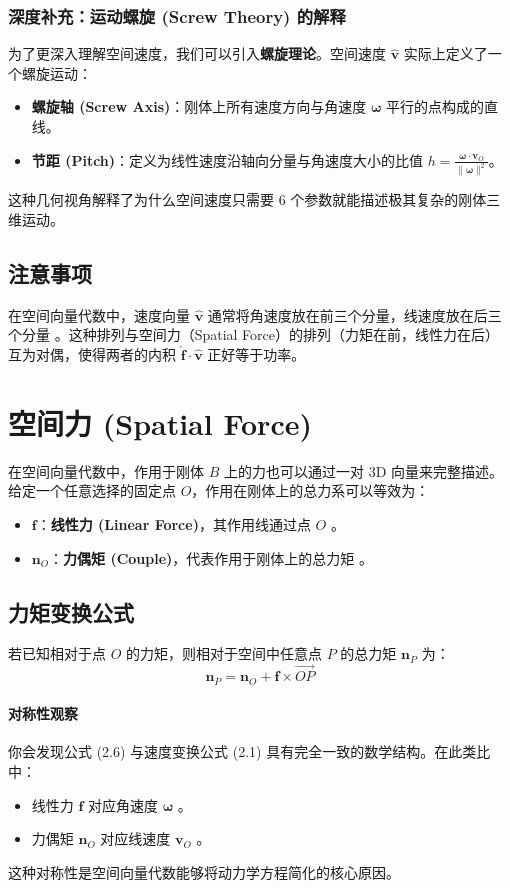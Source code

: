 \subsubsection{深度补充：运动螺旋 (Screw Theory) 的解释}
为了更深入理解空间速度，我们可以引入\textbf{螺旋理论}。空间速度 $\hat{\bm{v}}$ 实际上定义了一个螺旋运动：
\begin{itemize}
    \item \textbf{螺旋轴 (Screw Axis)}：刚体上所有速度方向与角速度 $\bm{\omega}$ 平行的点构成的直线。
    \item \textbf{节距 (Pitch)}：定义为线性速度沿轴向分量与角速度大小的比值 $h = \frac{\bm{\omega} \cdot \bm{v}_O}{\|\bm{\omega}\|^2}$。
\end{itemize}
这种几何视角解释了为什么空间速度只需要 6 个参数就能描述极其复杂的刚体三维运动。


\subsection{注意事项}
在空间向量代数中，速度向量 $\hat{\bm{v}}$ 通常将角速度放在前三个分量，线速度放在后三个分量 。这种排列与空间力（Spatial Force）的排列（力矩在前，线性力在后）互为对偶，使得两者的内积 $\hat{\bm{f}} \cdot \hat{\bm{v}}$ 正好等于功率。



\section{空间力 (Spatial Force)}

在空间向量代数中，作用于刚体 $B$ 上的力也可以通过一对 3D 向量来完整描述。给定一个任意选择的固定点 $O$，作用在刚体上的总力系可以等效为：
\begin{itemize}
    \item $\bm{f}$：\textbf{线性力 (Linear Force)}，其作用线通过点 $O$ 。
    \item $\bm{n}_O$：\textbf{力偶矩 (Couple)}，代表作用于刚体上的总力矩 。
\end{itemize}

\subsection{力矩变换公式}
若已知相对于点 $O$ 的力矩，则相对于空间中任意点 $P$ 的总力矩 $\bm{n}_P$ 为：
\begin{equation}
\bm{n}_P = \bm{n}_O + \bm{f} \times \vec{OP} \tag{2.6}
\end{equation}


\paragraph{对称性观察} 
你会发现公式 (2.6) 与速度变换公式 (2.1) 具有完全一致的数学结构。在此类比中：
\begin{itemize}
    \item 线性力 $\bm{f}$ 对应角速度 $\bm{\omega}$ 。
    \item 力偶矩 $\bm{n}_O$ 对应线速度 $\bm{v}_O$ 。
\end{itemize}
这种对称性是空间向量代数能够将动力学方程简化的核心原因。


